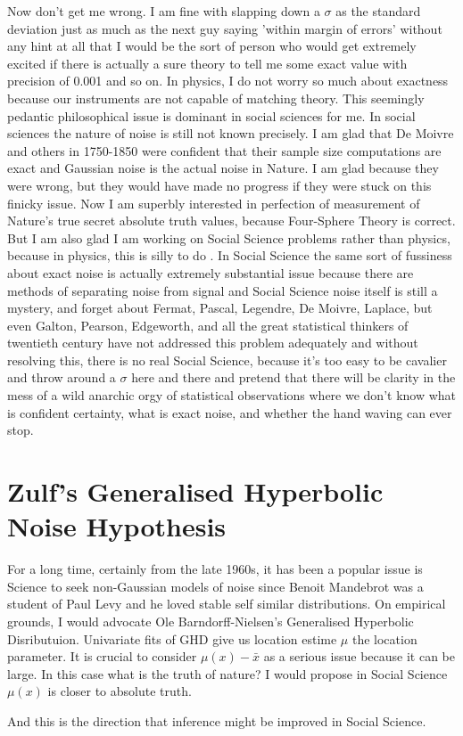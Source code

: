 \documentclass{amsart}
\begin{document}
Now don't get me wrong.  I am fine with slapping down a $\sigma$ as the standard deviation just as much as the next guy saying 'within margin of errors' without any hint at all that I would be the sort of person who would get extremely excited if there is actually a sure theory to tell me some exact value with precision of 0.001 and so on.  In physics, I do not worry so much about exactness because our instruments are not capable of matching theory.  This seemingly pedantic philosophical issue is dominant in social sciences for me.  In social sciences the nature of noise is still not known precisely.  I am glad that De Moivre and others in 1750-1850 were confident that their sample size computations are exact and Gaussian noise is the actual noise in Nature.  I am glad because they were wrong, but they would have made no progress if they were stuck on this finicky issue.  Now I am superbly interested in perfection of measurement of Nature's true secret absolute truth values, because Four-Sphere Theory is correct.  But I am also glad I am working on Social Science problems rather than physics, because in physics, this is silly to do .  In Social Science the same sort of fussiness about exact noise is actually extremely substantial issue because there are methods of separating noise from signal and Social Science noise itself is still a mystery, and forget about Fermat, Pascal, Legendre, De Moivre, Laplace, but even Galton, Pearson, Edgeworth, and all the great statistical thinkers of twentieth century have not addressed this problem adequately and without resolving this, there is no real Social Science, because it's too easy to be cavalier and throw around a $\sigma$ here and there and pretend that there will be clarity in the mess of a wild anarchic orgy of statistical observations where we don't know what is confident certainty, what is exact noise, and whether the hand waving can ever stop.

\section{Zulf's Generalised Hyperbolic Noise Hypothesis}

For a long time, certainly from the late 1960s, it has been a popular issue is Science to seek non-Gaussian models of noise since Benoit Mandebrot was a student of Paul Levy and he loved stable self similar distributions.  On empirical grounds, I would advocate Ole Barndorff-Nielsen's Generalised Hyperbolic Disributuion.  Univariate fits of GHD give us location estime $\mu$ the location parameter.  It is crucial to consider $\mu(x)-\bar{x}$ as a serious issue because it can be large.  In this case what is the truth of nature?
I would propose in Social Science $\mu(x)$ is closer to absolute truth.

And this is the direction that inference might be improved in Social Science.
\end{document}
